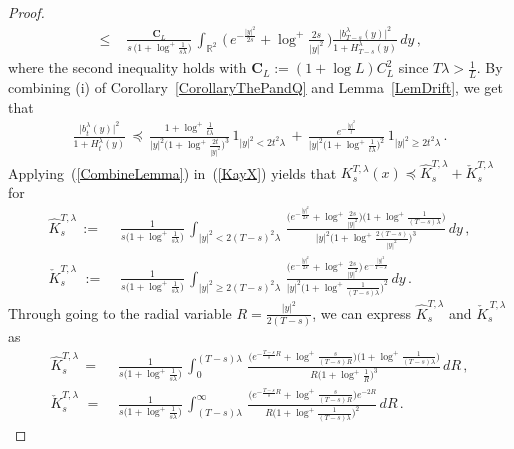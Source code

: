 \documentclass[10pt]{article}
\numberwithin{equation}{section}
\theoremstyle{definition}
\newcommand{\R}{{\mathbb R}}
\begin{document}
\begin{proof}
\begin{align}
  \,\leq \,&\,\frac{\mathbf{C}_L}{s\,\big( 1+ \log^+ \frac{1}{s\lambda } \big) }\,\int_{\R^2}  \,\bigg(\, e^{-\frac{|y|^2}{2s}}+\log^{+}\frac{2s}{|y|^2}  \,\bigg) \frac{\big| b_{T-s}^{\lambda}(y)\big|^2}{1+ H_{T-s}^{\lambda}(y)}\,dy\,, \label{KayX}
\end{align}
where the second inequality holds with $\mathbf{C}_L:= (1+\log L)C_L^2 $   since $T\lambda>\frac{1}{L} $.   By combining (i) of  Corollary~\ref{CorollaryThePandQ} and Lemma~\ref{LemDrift},  we get that
\begin{align}\label{CombineLemma}
\frac{\big| b_{t}^{\lambda}(y)\big|^2}{1+ H_{t}^{\lambda}(y) } \,\preceq \, \frac{ 1+\log^+\frac{1}{t\lambda} }{|y|^2\big(1+\log^+ \frac{2t}{|y|^2}  \big)^3 }\,1_{|y|^2 <  2t^2\lambda    }   \,+\,  \frac{e^{-\frac{|y|^2}{t}}    }{|y|^2\big(1+\log^+\frac{1}{t\lambda}\big)^2    }\,1_{|y|^2 \geq  2t^2 \lambda  } \,.
\end{align}
Applying~(\ref{CombineLemma}) in~(\ref{KayX}) yields that $ K_s^{T,\lambda}(x) \preceq  \hat{K}_s^{T,\lambda} + \check{K}_s^{T,\lambda} $ for
\begin{align*}
      \hat{K}_s^{T,\lambda}
        \, := \,&\,\frac{1}{s\big( 1+ \log^+ \frac{1}{s\lambda } \big)}\, \int_{|y|^2< 2(T-s)^2 \lambda}   \,\frac{\big( e^{-\frac{|y|^2}{2s}}+\log^{+}\frac{2s}{|y|^2}  \big) \big(1+\log^+\frac{1}{(T-s)\lambda}  \big)  }{|y|^2\big(1+\log^+ \frac{2(T-s)}{|y|^2}  \big)^3 }\,dy \,,\\
       \check{K}_s^{T,\lambda}\,
        \, := \,&\, \frac{1}{s\big( 1+ \log^+ \frac{1}{s\lambda } \big)}\,\int_{|y|^2\geq  2(T-s)^2 \lambda } \,\frac{\big( e^{-\frac{|y|^2}{2s}}+\log^{+}\frac{2s}{|y|^2}  \big)\,e^{-\frac{|y|^2}{T-s}}    }{|y|^2\big(1+\log^+\frac{1}{(T-s)\lambda}\big)^2    } \,dy\,.
    \end{align*}
Through going to the radial variable $R=\frac{|y|^2}{2(T-s)}$, we can express $\hat{K}_s^{T,\lambda}$ and $\check{K}_s^{\,T,\lambda}$ as
\begin{align*}
      \hat{K}_s^{T,\lambda}
        \, = \,&\,\frac{1}{s\big( 1+ \log^+\frac{1}{s\lambda } \big)} \,\int_{0}^{(T-s) \lambda} \,  \frac{\big( e^{-\frac{T-s}{s}R}+\log^{+}\frac{s}{(T-s)R}  \big)\big(1+\log^+\frac{1}{(T-s)\lambda} \big)  }{R\big(1+\log^+ \frac{1}{R}  \big)^3 }\,dR \,, \\
       \check{K}_s^{T,\lambda}\,
        \, = \,&\,\frac{1}{s\big( 1+\log^+ \frac{1}{s\lambda } \big)}\, \int^{\infty}_{(T-s) \lambda} \, \frac{\big( e^{-\frac{T-s}{s}R}+\log^{+}\frac{s}{(T-s)R}  \big)e^{-2R }    }{R\big(1+\log^+\frac{1}{(T-s)\lambda}\big)^2    }\, dR\,.

\end{align*}
\end{proof}
\end{document}
